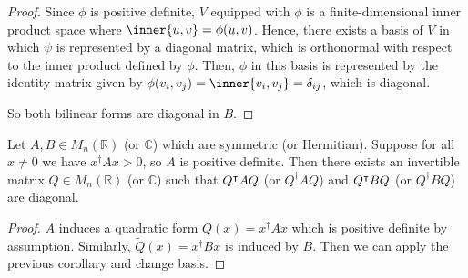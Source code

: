 \begin{proof}
	Since $\phi$ is positive definite, $V$ equipped with $\phi$ is a finite-dimensional inner product space where $\inner{u,v} = \phi(u,v)$.
	Hence, there exists a basis of $V$ in which $\psi$ is represented by a diagonal matrix, which is orthonormal with respect to the inner product defined by $\phi$.
	Then, $\phi$ in this basis is represented by the identity matrix given by $\phi(v_i, v_j) = \inner{v_i, v_j} = \delta_{ij}$, which is diagonal.

	So both bilinear forms are diagonal in $B$.
\end{proof}

\begin{corollary}
	Let $A, B \in M_n(\mathbb R)$ (or $\mathbb C$) which are symmetric (or Hermitian).
	Suppose for all $x \neq 0$ we have $x^\dagger A x > 0$, so $A$ is positive definite.
	Then there exists an invertible matrix $Q \in M_n(\mathbb R)$ (or $\mathbb C$) such that $Q^\intercal A Q$ (or $Q^\dagger A Q$) and $Q^\intercal B Q$ (or $Q^\dagger B Q$) are diagonal.
\end{corollary}

\begin{proof}
	$A$ induces a quadratic form $Q(x) = x^\dagger A x$ which is positive definite by assumption.
	Similarly, $\widetilde Q(x) = x^\dagger B x$ is induced by $B$.
	Then we can apply the previous corollary and change basis.
\end{proof}